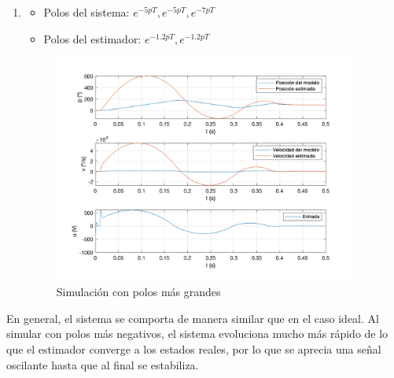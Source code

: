 \documentclass[a4paper, 12pt]{article}
\begin{document}
\begin{enumerate}
\item 
	\begin{itemize}
		\item Polos del sistema: $e^{-5pT}, e^{-5pT}, e^{-7pT}$
		\item Polos del estimador: $e^{-1.2pT}, e^{-1.2pT}$
	\end{itemize}

\begin{figure}[H]
	\centering
	\includegraphics*[height = 7.5cm]{figs/p5/ki5}
	\caption{Simulación con polos más grandes}
\end{figure}

\end{enumerate}
En general, el sistema se comporta de manera similar que en el caso ideal. Al simular con polos más negativos, el sistema evoluciona mucho más rápido de lo que el estimador converge a los estados reales, por lo que se aprecia una señal oscilante hasta que al final se estabiliza.
\end{document}
